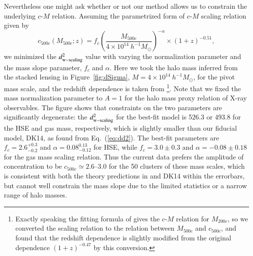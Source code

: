 \documentclass[iop, apj]{emulateapj}
\newcommand{\?}{\stackrel{?}{=}}
\begin{document}
Nevertheless one might ask whether or not our method allows us to
constrain the underlying $c$-$M$ relation.
Assuming the parametrized form of $c$-$M$ scaling relation given by
%
\begin{equation}
 c_{500c}(M_{500c};z)=f_c\left(\frac{M_{500c}}{4\times
		      10^{14}~h^{-1}M_\odot}\right)^{-\alpha}\times
 (1+z)^{-0.51},
 \label{eq:c-m_vary}
\end{equation}
%
we minimized the $d^2_{\rm w-scaling}$ value with varying the
normalization parameter and the mass slope parameter, $f_c$ and
$\alpha$. Here we took the halo mass inferred from the stacked lensing in
Figure~\ref{fig:dSigma}, $M=4\times 10^{14}~h^{-1}M_\odot$, for the
pivot mass scale, and the redshift dependence is taken from
\citet{Duffyetal:08}\footnote{Exactly speaking the fitting formula of
\citet{Duffyetal:08} gives the $c$-$M$ relation for $M_{200c}$, so we
converted the scaling relation to the relation between $M_{500c}$ and
$c_{500c}$, and found that the redshift dependence is slightly modified
from the original dependence $(1+z)^{-0.47}$ by this conversion.}.  Note
that
we fixed the mass normalization parameter to $A=1$ for the halo mass
proxy relation of X-ray observables. The figure shows that constraints
on the two parameters are significantly degenerate: the $d^2_{\rm
w-scaling}$ for the best-fit model is 526.3 or 493.8 for the HSE and gas
mass, respectively, which is slightly smaller than our fiducial model,
DK14, as found from Eq.~(\ref{eq:dd2}).  The best-fit parameters are
$f_c=2.6_{-0.2}^{+0.3}$ and $\alpha=0.08^{0.13}_{-0.12}$ for HSE, while
$f_c=3.0\pm 0.3$ and $\alpha=-0.08\pm 0.18$ for the gas mass scaling
relation.  Thus the current data prefers the amplitude of concentration
to be $c_{500c}\simeq 2.6$--3.0 for the 50 clusters of these mass
scales, which is consistent with both the theory predictions in
\citet{Duffyetal:08} and DK14 within the errorbars, but cannot well
constrain the mass slope due to the limited statistics or a narrow
range of halo masses.
\end{document}
